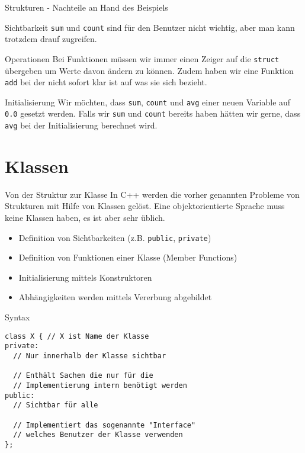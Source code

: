 \documentclass[presentation]{beamer}
\begin{document}
\begin{frame}[label={sec:orgad1e7fb},fragile]{Strukturen - Nachteile an Hand des Beispiels}
 \begin{block}{Sichtbarkeit}
{\color{solarizedYellow}\verb!sum!} und {\color{solarizedYellow}\verb!count!} sind für den Benutzer nicht wichtig, aber man kann
trotzdem drauf zugreifen.
\end{block}
\begin{block}{Operationen}
Bei Funktionen müssen wir immer einen Zeiger auf die {\color{solarizedYellow}\verb!struct!}
übergeben um Werte davon ändern zu können. Zudem haben wir eine
Funktion {\color{solarizedYellow}\verb!add!} bei der nicht sofort klar ist auf was sie sich
bezieht.
\end{block}
\begin{block}{Initialisierung}
Wir möchten, dass {\color{solarizedYellow}\verb!sum!}, {\color{solarizedYellow}\verb!count!} und {\color{solarizedYellow}\verb!avg!} einer neuen Variable auf
{\color{solarizedYellow}\verb!0.0!} gesetzt werden. Falls wir {\color{solarizedYellow}\verb!sum!} und {\color{solarizedYellow}\verb!count!} bereits haben
hätten wir gerne, dass {\color{solarizedYellow}\verb!avg!} bei der Initialisierung berechnet wird.
\end{block}
\end{frame}
\section{Klassen}
\label{sec:orged44c9a}
\begin{frame}[label={sec:org5d5e121},fragile]{Von der Struktur zur Klasse}
 In C++ werden die vorher genannten Probleme von Strukturen mit Hilfe
von \alert{Klassen} gelöst. Eine objektorientierte Sprache muss keine
Klassen haben, es ist aber sehr üblich.
\begin{itemize}
\item Definition von Sichtbarkeiten (z.B. {\color{solarizedYellow}\verb!public!}, {\color{solarizedYellow}\verb!private!})
\item Definition von Funktionen einer Klasse (\alert{Member Functions})
\item Initialisierung mittels \alert{Konstruktoren}
\item Abhängigkeiten werden mittels \alert{Vererbung} abgebildet
\end{itemize}
\begin{block}{Syntax}
\begin{verbatim}
class X { // X ist Name der Klasse
private:
  // Nur innerhalb der Klasse sichtbar

  // Enthält Sachen die nur für die 
  // Implementierung intern benötigt werden
public:
  // Sichtbar für alle

  // Implementiert das sogenannte "Interface"
  // welches Benutzer der Klasse verwenden
};
\end{verbatim}
\end{block}
\end{frame}
\end{document}
